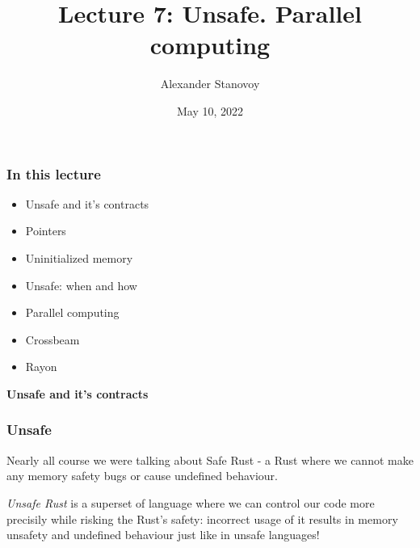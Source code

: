 \documentclass[aspectratio=1610,t]{beamer}
\title{Lecture 7: Unsafe. Parallel computing}
\date{May 10, 2022}
\author{Alexander Stanovoy}
\institute{alex.stanovoy@gmail.com}
\begin{document}

\begin{frame}
\maketitle
\end{frame}


\begin{frame}[fragile]
\frametitle{In this lecture}
\begin{itemize}
    \item Unsafe and it's contracts
    \item Pointers
    \item Uninitialized memory
    \item Unsafe: when and how
    \item Parallel computing
    \item Crossbeam
    \item Rayon
\end{itemize}
\end{frame}


\begin{frame}[c]
\centering\Huge\textbf{Unsafe and it's contracts}
\end{frame}


\begin{frame}[fragile]
\frametitle{Unsafe}
Nearly all course we were talking about Safe Rust - a Rust where we cannot make any memory safety bugs or cause undefined behaviour.

\textit{Unsafe Rust} is a superset of language where we can control our code more precisily while risking the Rust's safety: incorrect usage of it results in memory unsafety and undefined behaviour just like in unsafe languages!
\end{frame}

\end{document}
